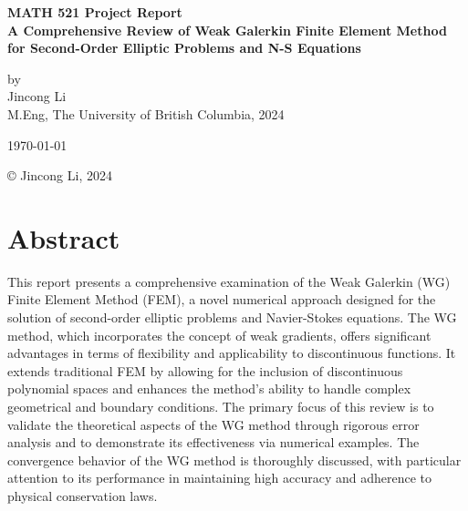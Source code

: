 \documentclass[12pt]{article} %
\begin{document}
\setlength{\parskip}{1em} 
\setlength{\parindent}{0pt}
\newcommand{\vect}[1]{\mathbf{#1}}

\begin{titlepage}  %
    \centering    %

    \vspace*{2cm}
    
    \normalsize \textbf{MATH 521 Project Report} \\
    \vspace{0.5cm}  %
    \normalsize\textbf{A Comprehensive Review of Weak Galerkin Finite Element Method for Second-Order Elliptic Problems and N-S Equations} \\
    \vspace{2cm}  %
    
    \normalsize by\\
    \vspace{1cm}
    \normalsize Jincong Li \\ 
    \vspace{1cm}
    \normalsize M.Eng, The University of British Columbia, 2024
    \vspace{11cm}  %
    
    \normalsize \today

    \vfill  %
    © Jincong Li, 2024
\end{titlepage}
\tableofcontents
\newpage
\section{Abstract}
This report presents a comprehensive examination of the Weak Galerkin (WG) Finite Element Method (FEM), a novel numerical approach designed for the solution of second-order elliptic problems and Navier-Stokes equations. The WG method, which incorporates the concept of weak gradients, offers significant advantages in terms of flexibility and applicability to discontinuous functions. It extends traditional FEM by allowing for the inclusion of discontinuous polynomial spaces and enhances the method's ability to handle complex geometrical and boundary conditions. The primary focus of this review is to validate the theoretical aspects of the WG method through rigorous error analysis and to demonstrate its effectiveness via numerical examples. The convergence behavior of the WG method is thoroughly discussed, with particular attention to its performance in maintaining high accuracy and adherence to physical conservation laws.
\end{document}
